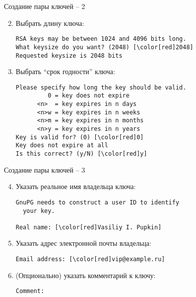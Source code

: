 \documentclass[presentation]{beamer}
\begin{document}
\begin{frame}[fragile]{Создание пары ключей -- 2}
  \begin{enumerate}
    \setcounter{enumi}{1}
  \item Выбрать длину ключа:
\begin{Verbatim}[commandchars=\\\[\]]
RSA keys may be between 1024 and 4096 bits long.
What keysize do you want? (2048) [\color[red]2048]
Requested keysize is 2048 bits
\end{Verbatim}
  \item Выбрать ``срок годности'' ключа:
\begin{Verbatim}[commandchars=\\\[\]]
Please specify how long the key should be valid.
         0 = key does not expire
      <n>  = key expires in n days
      <n>w = key expires in n weeks
      <n>m = key expires in n months
      <n>y = key expires in n years
Key is valid for? (0) [\color[red]0]
Key does not expire at all
Is this correct? (y/N) [\color[red]y]
\end{Verbatim}
    \end{enumerate}
\end{frame}

\begin{frame}[fragile]{Создание пары ключей -- 3}
  \begin{enumerate}
    \setcounter{enumi}{3}
  \item Указать реальное имя владельца ключа:
\begin{Verbatim}[commandchars=\\\[\]]
GnuPG needs to construct a user ID to identify
  your key.

Real name: [\color[red]Vasiliy I. Pupkin]
\end{Verbatim}
  \item Указать адрес электронной почты владельца:
\begin{Verbatim}[commandchars=\\\[\]]
Email address: [\color[red]vip@example.ru]
\end{Verbatim}

  \item (Опционально) указать комментарий к ключу:
\begin{Verbatim}[commandchars=\\\[\]]
Comment:
\end{Verbatim}
    \end{enumerate}
\end{frame}
\end{document}
